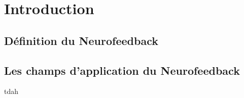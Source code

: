 \chapter{Introduction}



\section{Définition du Neurofeedback}

\section{Les champs d'application du Neurofeedback}

\gls{tdah}